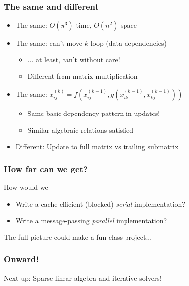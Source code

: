 \documentclass{beamer}
\begin{document}
\begin{frame}
  \frametitle{The same and different}
  
  \begin{itemize}
  \item The same: $O(n^3)$ time, $O(n^2)$ space
  \item The same: can't move $k$ loop (data dependencies)
    \begin{itemize}
    \item ... at least, can't without care!
    \item Different from matrix multiplication
    \end{itemize}
  \item The same: 
    $x_{ij}^{(k)} = f\left(x_{ij}^{(k-1)}, 
    g\left(x_{ik}^{(k-1)}, x_{kj}^{(k-1)}\right)\right)$
    \begin{itemize}
    \item Same basic dependency pattern in updates!
    \item Similar algebraic relations satisfied
    \end{itemize}
  \item Different: Update to full matrix vs trailing submatrix
  \end{itemize}
\end{frame}


\begin{frame}
  \frametitle{How far can we get?}
  
  How would we
  \begin{itemize}
  \item Write a cache-efficient (blocked) {\em serial} implementation?
  \item Write a message-passing {\em parallel} implementation?
  \end{itemize}

  \vspace{1cm}
  The full picture could make a fun class project...

\end{frame}


\begin{frame}
  \frametitle{Onward!}
  
  Next up: Sparse linear algebra and iterative solvers!
\end{frame}
\end{document}
